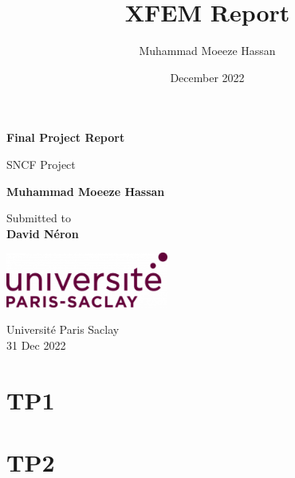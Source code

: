 \documentclass[11pt]{report}
\title{XFEM Report}
\author{Muhammad Moeeze Hassan}
\date{December 2022}
\begin{document}
\dominitoc

\begin{titlepage}
    \begin{center}
        \vspace*{1cm}
            
        \Huge
        \textbf{Final Project Report}
            
        \vspace{0.5cm}
        \LARGE
        SNCF Project
            
        \vspace{1.5cm}
            
        \textbf{Muhammad Moeeze Hassan}
            
        \vfill
            
        Submitted to\\
        \textbf{David Néron}
            
        \vspace{0.8cm}
            
        \includegraphics[width=0.4\textwidth]{assets/logo.png}
            
        \Large
        Université Paris Saclay\\
        31 Dec 2022
            
    \end{center}
\end{titlepage}


\tableofcontents
\adjustmtc
\newpage
\listoffigures
\newpage


\chapter{TP1}
\minitoc
\pagebreak
\label{Chap: TP 1}


\chapter{TP2}
\minitoc
\pagebreak
\label{Chap: TP 2}





\printbibliography
\end{document}
